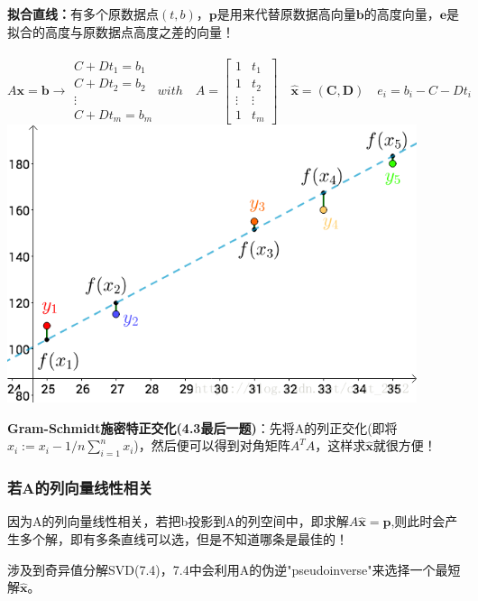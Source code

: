     \textbf{拟合直线：}有多个原数据点$(t,b)$，$\bm{p}$是用来代替原数据高向量$\bm{b}$的高度向量，$\bm{e}$是拟合的高度与原数据点高度之差的向量！\\
    \\
    $$
    A \boldsymbol{x}=\boldsymbol{b}
    \rightarrow
    \begin{array}{l}{C+D t_{1}=b_{1}} \\ {C+D t_{2}=b_{2}} \\ {\vdots} \\ {C+D t_{m}=b_{m}}\end{array}
    with\quad A=\left[\begin{array}{cc}{1} & {t_{1}} \\ {1} & {t_{2}} \\ {\vdots} & {\vdots} \\ {1} & {t_{m}}\end{array}\right]
    \quad \widehat{\boldsymbol{x}}=(\boldsymbol{C}, \boldsymbol{D}) \quad e_{i}=b_{i}-C-D t_{i}
    $$
    \includegraphics[width=0.9\textwidth]{./least square.png}

    \textbf{Gram-Schmidt施密特正交化(4.3最后一题)}：先将A的列正交化(即将$x_i := x_i - 1/n\sum_{i=1}^{n}x_i$)，然后便可以得到对角矩阵$A^T A$，这样求$\widehat{\bm{x}}$就很方便！

    \subsubsection{若A的列向量线性相关}

    因为A的列向量线性相关，若把b投影到A的列空间中，即求解$A \widehat{\boldsymbol{x}}=\boldsymbol{p}$,则此时会产生多个解，即有多条直线可以选，但是不知道哪条是最佳的！

    涉及到奇异值分解SVD(7.4)，7.4中会利用A的伪逆"pseudoinverse"来选择一个最短解$\widehat{\bm{x}}$。

